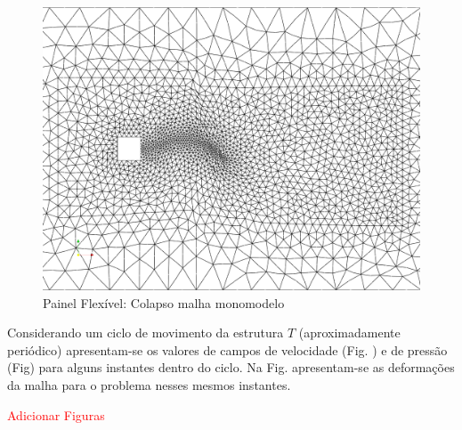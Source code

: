 \documentclass[tese_patricia]{subfiles}
\begin{document}
\begin{figure}[htb!]
	\centering 
	\includegraphics[scale=0.25,trim=0cm 0cm 0cm 0cm, clip=true]{Imagens/Cap7/prism_deforMalhaMono.pdf}	
	\caption{Painel Flexível: Colapso malha monomodelo}
	\label{fig:prisma_deforMalhaMono}
\end{figure}

Considerando um ciclo de movimento da estrutura $T$ (aproximadamente periódico) apresentam-se os valores de campos de velocidade (Fig. ) e de pressão (Fig) para alguns instantes dentro do ciclo. Na Fig. apresentam-se as deformações da malha para o problema nesses mesmos instantes.

\textcolor{red}{Adicionar Figuras}
	
\end{document}
